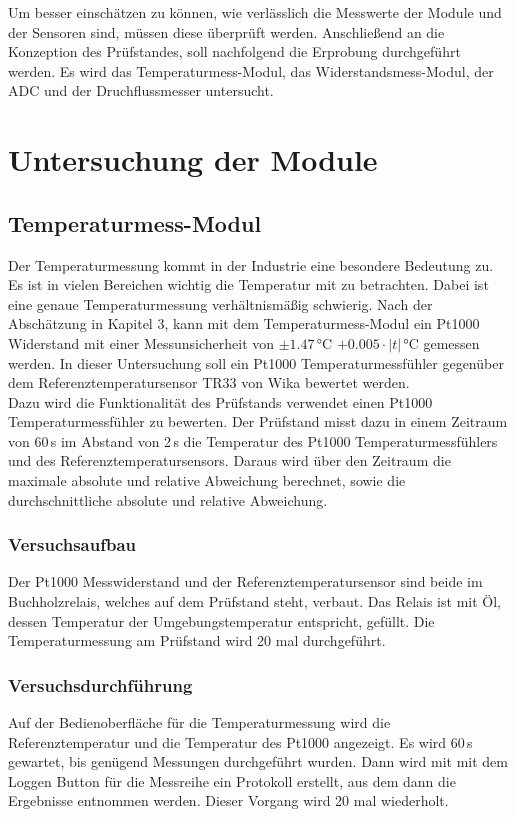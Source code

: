 Um besser einschätzen zu können, wie verlässlich die Messwerte der Module und der Sensoren sind, müssen diese überprüft werden. Anschließend an die Konzeption des Prüfstandes, soll nachfolgend die Erprobung durchgeführt werden. Es wird das Temperaturmess-Modul, das Widerstandsmess-Modul, der ADC und der Druchflussmesser untersucht.

\section{Untersuchung der Module}


\subsection{Temperaturmess-Modul}
Der Temperaturmessung kommt in der Industrie eine besondere Bedeutung zu. Es ist in vielen Bereichen wichtig die Temperatur mit zu betrachten. Dabei ist eine genaue Temperaturmessung verhältnismäßig schwierig. Nach der Abschätzung in Kapitel 3, kann mit dem Temperaturmess-Modul ein Pt1000 Widerstand mit einer Messunsicherheit von \(\pm 1.47\)\,°C \(+ 0.005 \cdot |t|\)\,°C gemessen werden. In dieser Untersuchung soll ein Pt1000 Temperaturmessfühler gegenüber dem Referenztemperatursensor TR33 von Wika bewertet werden.
\\
Dazu wird die Funktionalität des Prüfstands verwendet einen Pt1000 Temperaturmessfühler zu bewerten. Der Prüfstand misst dazu in einem Zeitraum von 60\,s im Abstand von 2\,s die Temperatur des Pt1000 Temperaturmessfühlers und des Referenztemperatursensors. Daraus wird über den Zeitraum die maximale absolute und relative Abweichung berechnet, sowie die durchschnittliche absolute und relative Abweichung.

\subsubsection{Versuchsaufbau}
Der Pt1000 Messwiderstand und der Referenztemperatursensor sind beide im Buchholzrelais, welches auf dem Prüfstand steht, verbaut. Das Relais ist mit Öl, dessen Temperatur der Umgebungstemperatur entspricht, gefüllt. Die Temperaturmessung am Prüfstand wird 20 mal durchgeführt.

\subsubsection{Versuchsdurchführung}
Auf der Bedienoberfläche für die Temperaturmessung wird die Referenztemperatur und die Temperatur des Pt1000 angezeigt. Es wird 60\,s gewartet, bis genügend Messungen durchgeführt wurden. Dann wird mit mit dem Loggen Button für die Messreihe ein Protokoll erstellt, aus dem dann die Ergebnisse entnommen werden. Dieser Vorgang wird 20 mal wiederholt.

